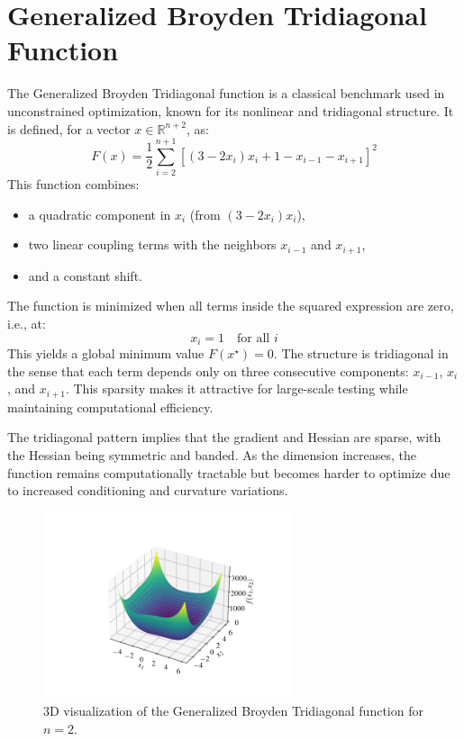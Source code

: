 \documentclass[a4paper,12pt]{article}
\begin{document}
	\section{Generalized Broyden Tridiagonal Function}
	
	The Generalized Broyden Tridiagonal function is a classical benchmark used in unconstrained optimization, known for its nonlinear and tridiagonal structure. It is defined, for a vector \( x \in \mathbb{R}^{n+2} \), as:
	\[
	F(x) = \frac{1}{2} \sum_{i=2}^{n+1} \left[ (3 - 2x_i)x_i + 1 - x_{i-1} - x_{i+1} \right]^2
	\]
	This function combines:
	\begin{itemize}[nosep]
		\item a quadratic component in \( x_i \) (from \( (3 - 2x_i)x_i \)),
		\item two linear coupling terms with the neighbors \( x_{i-1} \) and \( x_{i+1} \),
		\item and a constant shift.
	\end{itemize}
	
	The function is minimized when all terms inside the squared expression are zero, i.e., at:
	\[
	x_i = 1 \quad \text{for all } i
	\]
	This yields a global minimum value \( F(x^\star) = 0 \). The structure is tridiagonal in the sense that each term depends only on three consecutive components: \( x_{i-1} \), \( x_i \), and \( x_{i+1} \). This sparsity makes it attractive for large-scale testing while maintaining computational efficiency.
	
	The tridiagonal pattern implies that the gradient and Hessian are sparse, with the Hessian being symmetric and banded. As the dimension increases, the function remains computationally tractable but becomes harder to optimize due to increased conditioning and curvature variations.
	
	\begin{figure}[htbp]
		\centering
		\includegraphics[width=0.65\textwidth]{../immagini/broyden.png}
		\caption{3D visualization of the Generalized Broyden Tridiagonal function for $n=2$.}
		\label{fig:broyden3D}
	\end{figure}
	
\end{document}
